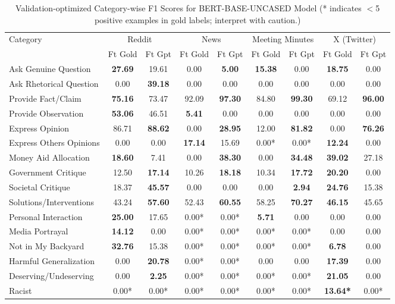 \begin{table}[htbp]
\centering
\begin{tabular}{l *{8}{c}}
\toprule
Category & \multicolumn{2}{c}{Reddit} & \multicolumn{2}{c}{News} & \multicolumn{2}{c}{Meeting Minutes} & \multicolumn{2}{c}{X (Twitter)} \\
& Ft Gold & Ft Gpt & Ft Gold & Ft Gpt & Ft Gold & Ft Gpt & Ft Gold & Ft Gpt \\
\midrule
Ask Genuine Question & \textbf{27.69} & 19.61 & 0.00 & \textbf{5.00} & \textbf{15.38} & 0.00 & \textbf{18.75} & 0.00 \\
Ask Rhetorical Question & 0.00 & \textbf{39.18} & 0.00 & 0.00 & 0.00 & 0.00 & 0.00 & 0.00 \\
Provide Fact/Claim & \textbf{75.16} & 73.47 & 92.09 & \textbf{97.30} & 84.80 & \textbf{99.30} & 69.12 & \textbf{96.00} \\
Provide Observation & \textbf{53.06} & 46.51 & \textbf{5.41} & 0.00 & 0.00 & 0.00 & 0.00 & 0.00 \\
Express Opinion & 86.71 & \textbf{88.62} & 0.00 & \textbf{28.95} & 12.00 & \textbf{81.82} & 0.00 & \textbf{76.26} \\
Express Others Opinions & 0.00 & 0.00 & \textbf{17.14} & 15.69 & 0.00* & 0.00* & \textbf{12.24} & 0.00 \\
Money Aid Allocation & \textbf{18.60} & 7.41 & 0.00 & \textbf{38.30} & 0.00 & \textbf{34.48} & \textbf{39.02} & 27.18 \\
Government Critique & 12.50 & \textbf{17.14} & 10.26 & \textbf{18.18} & 10.34 & \textbf{17.72} & \textbf{20.20} & 0.00 \\
Societal Critique & 18.37 & \textbf{45.57} & 0.00 & 0.00 & 0.00 & \textbf{2.94} & \textbf{24.76} & 15.38 \\
Solutions/Interventions & 43.24 & \textbf{57.60} & 52.43 & \textbf{60.55} & 58.25 & \textbf{70.27} & \textbf{46.15} & 45.65 \\
Personal Interaction & \textbf{25.00} & 17.65 & 0.00* & 0.00* & \textbf{5.71} & 0.00 & 0.00 & 0.00 \\
Media Portrayal & \textbf{14.12} & 0.00 & 0.00* & 0.00* & 0.00* & 0.00* & 0.00 & 0.00 \\
Not in My Backyard & \textbf{32.76} & 15.38 & 0.00* & 0.00* & 0.00* & 0.00* & \textbf{6.78} & 0.00 \\
Harmful Generalization & 0.00 & \textbf{20.78} & 0.00* & 0.00* & 0.00 & 0.00 & \textbf{17.39} & 0.00 \\
Deserving/Undeserving & 0.00 & \textbf{2.25} & 0.00* & 0.00* & 0.00* & 0.00* & \textbf{21.05} & 0.00 \\
Racist & 0.00* & 0.00* & 0.00* & 0.00* & 0.00* & 0.00* & \textbf{13.64*} & 0.00* \\
\bottomrule
\end{tabular}
\centering\caption{Validation-optimized Category-wise F1 Scores for BERT-BASE-UNCASED Model (* indicates $<$5 positive examples in gold labels; interpret with caution.)}
\label{tab:bert-base-uncased_category_breakdown}
\end{table}